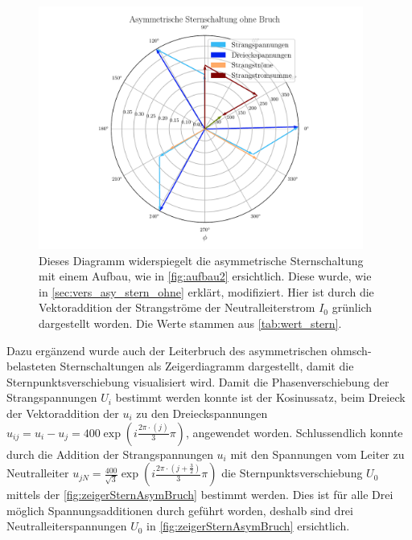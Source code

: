 \documentclass[12pt,english,ngerman]{scrartcl}
\begin{document}
\begin{figure}[H]
	\begin{center}
		\includegraphics[width = 0.95\textwidth]{figures/zeigerSternAsymOhneBruch.pdf}
	\end{center}
	\caption[Zeigerdiagramm einer asymmetrisch ohmsch-belastete Sternschaltung ohne
		Neutralleiterbruch]{Dieses Diagramm widerspiegelt die asymmetrische
		Sternschaltung mit einem Aufbau, wie in \autoref{fig:aufbau2} ersichtlich.
		Diese wurde, wie in \autoref{sec:vers_asy_stern_ohne} erklärt, modifiziert.
		Hier ist durch die Vektoraddition der Strangströme der Neutralleiterstrom $I_0$
		grünlich dargestellt worden. Die Werte stammen aus \autoref{tab:wert_stern}.
	}\label{fig:zeigerSternAsymOhneBruch}
\end{figure}

Dazu ergänzend wurde auch der Leiterbruch des asymmetrischen ohmsch-belasteten
Sternschaltungen als Zeigerdiagramm dargestellt, damit die
Sternpunktsverschiebung visualisiert wird. Damit die Phasenverschiebung der
Strangspannungen $U_i$ bestimmt werden konnte ist der Kosinussatz, beim Dreieck
der Vektoraddition der $u_i$ zu den Dreieckspannungen $u_{ij} = u_i-u_j =
	400\exp(i\frac{2\pi\cdot(j)}{3}\pi)$, angewendet worden. Schlussendlich konnte
durch die Addition der Strangspannungen $u_i$ mit den Spannungen vom Leiter zu
Neutralleiter $u_{jN} =
	\frac{400}{\sqrt{3}}\exp(i\frac{2\pi\cdot(j+\frac{3}{2})}{3}\pi)$ die
Sternpunktsverschiebung $U_0$ mittels der \autoref{fig:zeigerSternAsymBruch}
bestimmt werden. Dies ist für alle Drei möglich Spannungsadditionen durch
geführt worden, deshalb sind drei Neutralleiterspannungen $U_0$ in
\autoref{fig:zeigerSternAsymBruch} ersichtlich.
\end{document}
